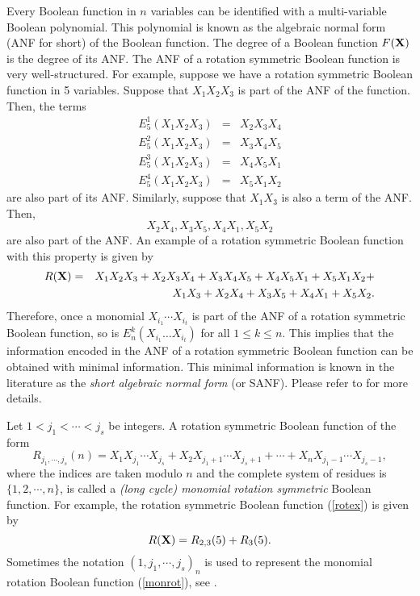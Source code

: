 Every Boolean function in $n$ variables can be identified with a multi-variable Boolean polynomial.  This polynomial is known as the algebraic normal form (ANF for short) of the Boolean function.  The 
degree of a Boolean function $F({\bf X})$ is the degree of its ANF.  The ANF of a rotation symmetric Boolean function is very well-structured.  For example, suppose we have a rotation symmetric Boolean function in 5 variables.  Suppose that $X_1X_2X_3$ is part of the ANF of the function.  Then, the terms
\begin{eqnarray}
E_5^1(X_1X_2X_3)&=&X_2X_3X_4\\\nonumber
E_5^2(X_1X_2X_3)&=&X_3X_4X_5\\\nonumber 
E_5^3(X_1X_2X_3)&=&X_4X_5X_1\\ \nonumber
E_5^4(X_1X_2X_3)&=&X_5X_1X_2
\end{eqnarray}
are also part of its ANF.  Similarly, suppose that $X_1X_3$ is also a term of the ANF.  Then, 
$$X_2X_4, X_3X_5, X_4X_1, X_5X_2$$
are also part of the ANF.  An example of a rotation symmetric Boolean function with this property is given by
\begin{eqnarray}
\label{rotex}
R({\bf X}) &=&X_1X_2X_3+X_2X_3X_4+X_3X_4X_5+X_4X_5X_1+ X_5X_1X_2+\\\nonumber
&&X_1X_3+X_2X_4+ X_3X_5+ X_4X_1+ X_5X_2.
\end{eqnarray}
Therefore, once a monomial $X_{i_1}\cdots X_{i_t}$ is part of the ANF of a rotation symmetric Boolean function, so is $E_n^k(X_{i_1}\ldots X_{i_t})$ for all $1\leq k \leq n$.  This implies that the 
information encoded in the ANF of a rotation symmetric Boolean function can be obtained with minimal information.   This minimal information is known in the literature as the {\it short algebraic normal form} (or SANF).  Please refer to \cite{stanicamaitra} for more details.


Let $1<j_1<\cdots< j_s$ be integers.  A rotation symmetric Boolean function of the form 
\begin{equation}
\label{monrot}
R_{j_1,\cdots, j_s}(n)=X_1X_{j_1}\cdots X_{j_s}+X_2X_{j_1+1}\cdots X_{j_s+1}+\cdots+X_nX_{j_1-1}\cdots X_{j_s-1},
\end{equation}
where the indices are taken modulo $n$ and the complete system of residues is $\{1,2,\cdots, n\}$, is called a  {\it (long cycle) monomial rotation symmetric} Boolean function.  For example, the rotation symmetric 
Boolean function (\ref{rotex}) is given by
\begin{equation}
 R({\bf X}) = R_{2,3}(5) + R_{3}(5).
\end{equation}
Sometimes the notation $(1,j_1,\cdots, j_s)_n$ is used to represent the monomial rotation Boolean function (\ref{monrot}), see \cite{cusickArXiv}.

